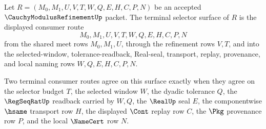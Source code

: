 \begin{definition}
\label{def:cauchy-modulus-refinement-terminal-selector-surface}
Let $R=(M_0,M_1,U,V,T,W,Q,E,H,C,P,N)$ be an accepted $\CauchyModulusRefinementUp$ packet. The terminal selector surface of $R$ is the displayed consumer route
$$
M_0,M_1,U,V,T,W,Q,E,H,C,P,N
$$
from the shared meet rows $M_0,M_1,U$, through the refinement rows $V,T$, and into the selected-window, tolerance-readback, Real-seal, transport, replay, provenance, and local naming rows $W,Q,E,H,C,P,N$.

Two terminal consumer routes agree on this surface exactly when they agree on the selector budget $T$, the selected window $W$, the dyadic tolerance $Q$, the $\RegSeqRatUp$ readback carried by $W,Q$, the $\RealUp$ seal $E$, the componentwise $\hsame$ transport row $H$, the displayed $\Cont$ replay row $C$, the $\Pkg$ provenance row $P$, and the local $\NameCert$ row $N$.
\end{definition}

